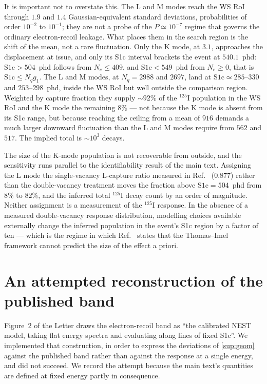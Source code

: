 \documentclass[11pt,a4paper]{article}
\begin{document}
It is important not to overstate this. The L and M modes reach the WS RoI
through \(1.9\) and \(1.4\) Gaussian-equivalent standard deviations,
probabilities of order \(10^{-2}\) to \(10^{-1}\); they are not a probe of
the \(P\simeq10^{-7}\) regime that governs the ordinary electron-recoil
leakage. What places them in the search region is the shift of the mean,
not a rare fluctuation. Only the K mode, at \(3.1\), approaches the
displacement at issue, and only its S1c interval brackets the event at
\(540.1\)~phd: \(\mathrm{S1c}>504\)~phd follows from \(N_e\le409\), and
\(\mathrm{S1c}<549\)~phd from \(N_e\geq0\), that is
\(\mathrm{S1c}\leq N_qg_1\). The L and M modes, at \(N_q=2988\) and
\(2697\), land at \(\mathrm{S1c}\simeq285\)--\(330\) and
\(253\)--\(298\)~phd, inside the WS RoI but well outside the comparison
region. Weighted by capture fraction they supply \(\sim\!92\%\) of the
\(^{125}\)I population in the WS RoI and the K mode the remaining
\(8\%\) --- not because the K mode is absent from its S1c range, but
because reaching the ceiling from a mean of \(916\) demands a much larger
downward fluctuation than the L and M modes require from \(562\) and
\(517\). The implied total is \(\sim\!10^{3}\) decays.

The size of the K-mode population is not recoverable from outside, and the
sensitivity runs parallel to the identifiability result of the main text.
Assigning the L mode the single-vacancy L-capture ratio measured in
Ref.~\cite{Recomb} (\(0.877\)) rather than the double-vacancy treatment
moves the fraction above \(\mathrm{S1c}=504\)~phd from \(8\%\) to
\(82\%\), and the inferred total \(^{125}\)I decay count by an order of
magnitude. Neither assignment is a measurement of the \(^{125}\)I
response. In the absence of a measured double-vacancy response
distribution, modelling choices available externally change the inferred
population in the event's S1c region by a factor of ten --- which is the
regime in which Ref.~\cite{Recomb} states that the Thomas--Imel framework
cannot predict the size of the effect a priori.


\section{An attempted reconstruction of the published band}
\label{sup:band}

Figure~2 of the Letter draws the electron-recoil band as ``the calibrated
NEST model, taking flat energy spectra and evaluating along lines of fixed
S1c''. We implemented that construction, in order to express the deviations
of \cref{sup:geom} against the published band rather than against the
response at a single energy, and did not succeed. We record the attempt
because the main text's quantities are defined at fixed energy partly in
consequence.
\end{document}

